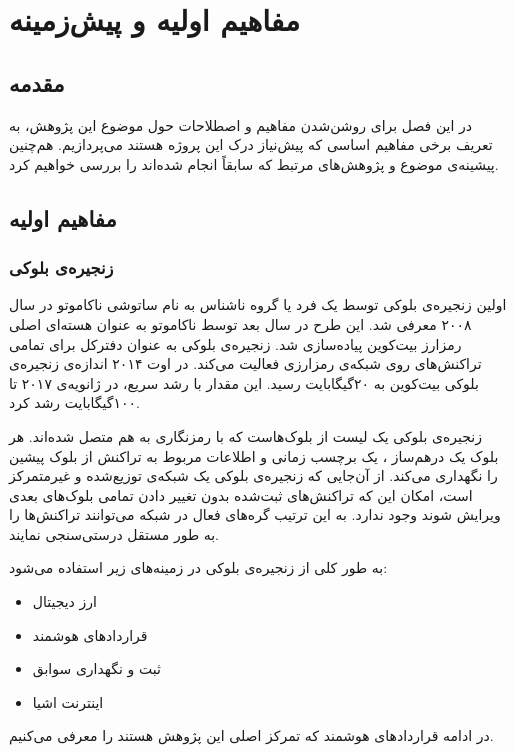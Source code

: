 \chapter{مفاهیم اولیه و پیش‌زمینه}

\section{مقدمه}
در این فصل برای روشن‌شدن مفاهیم و اصطلاحات حول موضوع این پژوهش، به تعریف برخی مفاهیم اساسی که پیش‌نیاز درک این پروژه هستند می‌پردازیم. هم‌چنین پیشینه‌ی موضوع و پژوهش‌های مرتبط که سابقاً انجام شده‌اند را بررسی خواهیم کرد.

\section{مفاهیم اولیه}
\subsection{زنجیره‌ی بلوکی}
اولین زنجیره‌ی بلوکی توسط یک فرد یا گروه ناشناس به نام ساتوشی ناکاموتو
 در سال ۲۰۰۸ معرفی شد. 
 \cite{nakamoto2012bitcoin}
 این طرح در سال بعد توسط ناکاموتو به عنوان هسته‌ای اصلی رمزارز بیت‌کوین پیاده‌سازی شد. زنجیره‌ی بلوکی به عنوان دفترکل
  برای تمامی تراکنش‌های روی شبکه‌ی رمزارزی فعالیت می‌کند. در اوت ۲۰۱۴ اندازه‌ی زنجیره‌ی بلوکی بیت‌کوین به ۲۰گیگابایت رسید. این مقدار با رشد سریع، در ژانویه‌ی ۲۰۱۷ تا ۱۰۰گیگابایت رشد کرد. 
  \cite{inbook}
  
  
زنجیره‌ی بلوکی یک لیست از بلوک‌هاست که با رمزنگاری به هم متصل شده‌اند. هر بلوک یک درهم‌ساز
، یک برچسب زمانی
و اطلاعات مربوط به تراکنش از بلوک پیشین را نگهداری می‌کند. \cite{10.5555/2994437}
از آن‌جایی که زنجیره‌ی بلوکی یک شبکه‌ی توزیع‌شده و غیرمتمرکز است، امکان این که تراکنش‌های ثبت‌شده بدون تغییر دادن تمامی بلوک‌های بعدی ویرایش شوند وجود ندارد. به این ترتیب گره‌های فعال در شبکه می‌توانند تراکنش‌ها را به طور مستقل درستی‌سنجی نمایند.


به طور کلی از زنجیره‌ی بلوکی در زمینه‌های زیر استفاده می‌شود:
\begin{itemize}
	\item ارز دیجیتال
	\item قراردادهای هوشمند
	\item ثبت و نگهداری سوابق
	\item اینترنت اشیا
\end{itemize}
در ادامه قراردادهای هوشمند که تمرکز اصلی این پژوهش هستند را معرفی می‌کنیم.
